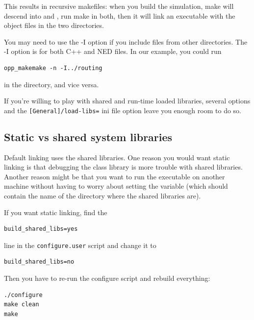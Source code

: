 This results in recursive makefiles: when you build the simulation, make
will descend into  and , run make in both, then
it will link an executable with the object files in the two directories.


You may need to use the -I option if you include files from other
directories. The -I option is for both C++ and NED
files. In our example, you could run

\begin{verbatim}
opp_makemake -n -I../routing
\end{verbatim}

in the  directory, and vice versa.

If you're willing to play with shared and run-time loaded libraries,
several  options and the
\texttt{[General]/load-libs=} ini file option leave you enough room to
do so.





\subsection{Static vs shared {\opp} system libraries}

Default linking uses the shared libraries. One
reason you would want static linking is that
debugging the {\opp} class library is more trouble
with shared libraries. Another reason might be that you want to run
the executable on another machine without having to worry about
setting the  variable (which should contain the name
of the directory where the {\opp} shared libraries are).

If you want static linking, find the

\begin{verbatim}
build_shared_libs=yes
\end{verbatim}


line in the \texttt{configure.user} script and change it to

\begin{verbatim}
build_shared_libs=no
\end{verbatim}

Then you have to re-run the configure script and rebuild everything:

\begin{verbatim}
./configure
make clean
make
\end{verbatim}



